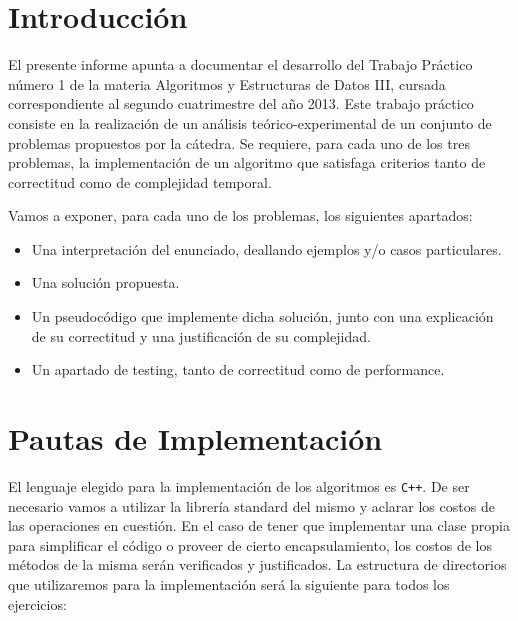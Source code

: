 \documentclass[10pt,a4paper]{article}
\begin{document}

\fecha{\today}



\maketitle

\tableofcontents
\newpage
\section{Introducción}
El presente informe apunta a documentar el desarrollo del Trabajo Práctico número 1 de la materia Algoritmos y Estructuras de Datos III, cursada correspondiente al segundo cuatrimestre del año 2013. Este trabajo pr\'actico consiste en la realización de un análisis teórico-experimental de un conjunto de problemas propuestos por la cátedra. Se requiere, para cada uno de los tres problemas, la implementación de un algoritmo que satisfaga criterios tanto de correctitud como de complejidad temporal.

Vamos a exponer, para cada uno de los problemas, los siguientes apartados:

\begin{itemize}
\item Una interpretación del enunciado, deallando ejemplos y/o casos particulares.
\item Una solución propuesta.
\item Un pseudocódigo que implemente dicha solución, junto con una explicación de su correctitud y una justificación de su complejidad.
\item Un apartado de testing, tanto de correctitud como de performance.
\end{itemize}


\section{Pautas de Implementación}
El lenguaje elegido para la implementación de los algoritmos es \texttt{C++}. De ser necesario vamos a utilizar la librería standard del mismo y aclarar los costos de las operaciones en cuestión. En el caso de tener que implementar una clase propia para simplificar el código o proveer de cierto encapsulamiento, los costos de los métodos de la misma serán verificados y justificados. La estructura de directorios que utilizaremos para la implementación será la siguiente para todos los ejercicios:
\end{document}
